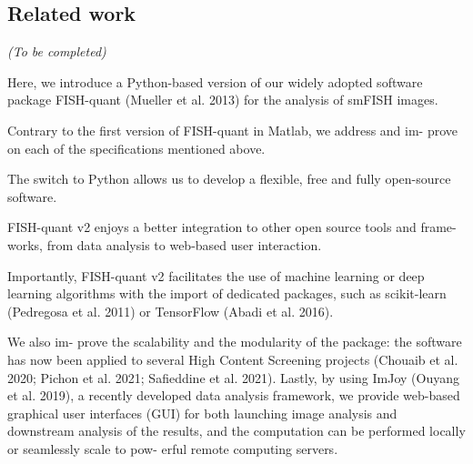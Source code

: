 \subsection{Related work}
\label{subsec:related_work_fishquant}

\begin{center}
	\textit{(To be completed)}
\end{center}







Here, we introduce a Python-based version of our widely adopted software package
FISH-quant (Mueller et al. 2013) for the analysis of smFISH images.

Contrary to
the first version of FISH-quant in Matlab, we address and im- prove on each of
the specifications mentioned above.

The switch to Python allows us to develop a
flexible, free and fully open-source software.

FISH-quant v2 enjoys a better
integration to other open source tools and frame- works, from data analysis to
web-based user interaction.

Importantly, FISH-quant v2 facilitates the use of
machine learning or deep learning algorithms with the import of dedicated packages,
such as scikit-learn (Pedregosa et al. 2011) or TensorFlow (Abadi et al. 2016).

We also im- prove the scalability and the modularity of the package: the software
has now been applied to several High Content Screening projects (Chouaib et
al. 2020; Pichon et al. 2021; Safieddine et al. 2021). Lastly, by using ImJoy (Ouyang et al. 2019),
a recently developed data analysis framework, we provide web-based graphical user
interfaces (GUI) for both launching image analysis and downstream analysis of the
results, and the computation can be performed locally or seamlessly scale to pow- erful remote computing servers.

